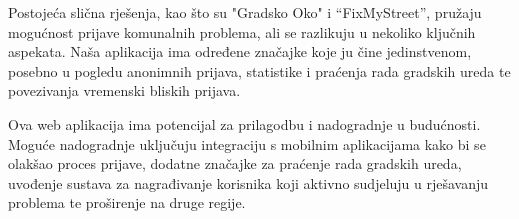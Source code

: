 \noindent Postojeća slična rješenja, kao što su "Gradsko Oko" i “FixMyStreet”, pružaju mogućnost prijave komunalnih problema, ali se razlikuju u nekoliko ključnih aspekata. Naša aplikacija ima određene značajke koje ju čine jedinstvenom, posebno u pogledu anonimnih prijava, statistike i praćenja rada gradskih ureda te povezivanja vremenski bliskih prijava.


\noindent Ova web aplikacija ima potencijal za prilagodbu i nadogradnje u budućnosti. Moguće nadogradnje uključuju integraciju s mobilnim aplikacijama kako bi se olakšao proces prijave, dodatne značajke za praćenje rada gradskih ureda, uvođenje sustava za nagrađivanje korisnika koji aktivno sudjeluju u rješavanju problema te proširenje na druge regije.

\eject






